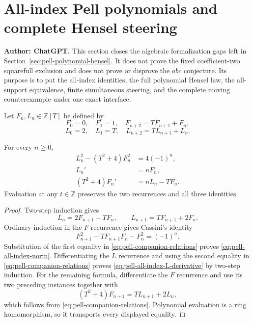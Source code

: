 
\section{All-index Pell polynomials and complete Hensel steering}
\label{sec:pell-all-index-formalization}

\noindent\textbf{Author: ChatGPT.}\quad
This section closes the algebraic formalization gaps left in
Section~\ref{sec:pell-polynomial-hensel}.  It does not prove the fixed
coefficient-two squarefull exclusion and does not prove or disprove the
$abc$ conjecture.  Its purpose is to put the all-index identities, the full
polynomial Hensel law, the all-support equivalence, finite simultaneous
steering, and the complete moving counterexample under one exact interface.

Let $F_n,L_n\in\mathbb Z[T]$ be defined by
\[
 F_0=0,\quad F_1=1,\quad F_{n+2}=TF_{n+1}+F_n,
\]
\[
 L_0=2,\quad L_1=T,\quad L_{n+2}=TL_{n+1}+L_n.
\]

\begin{theorem}
\label{thm:pell-all-index-polynomial}
For every $n\geq0$,
\begin{align}
 L_n^2-(T^2+4)F_n^2&=4(-1)^n,\label{eq:pell-all-index-norm}\\
 L_n'&=nF_n,\label{eq:pell-all-index-L-derivative}\\
 (T^2+4)F_n'&=nL_n-TF_n.\label{eq:pell-all-index-F-derivative}
\end{align}
Evaluation at any $t\in\mathbb Z$ preserves the two recurrences and all
three identities.
\end{theorem}

\begin{proof}
Two-step induction gives
\begin{equation}\label{eq:pell-companion-relations}
 L_n=2F_{n+1}-TF_n,
 \qquad L_{n+1}=TF_{n+1}+2F_n.
\end{equation}
Ordinary induction in the $F$ recurrence gives Cassini's identity
\[
 F_{n+1}^2-TF_{n+1}F_n-F_n^2=(-1)^n.
\]
Substitution of the first equality in
\eqref{eq:pell-companion-relations} proves
\eqref{eq:pell-all-index-norm}.  Differentiating the $L$ recurrence and
using the second equality in \eqref{eq:pell-companion-relations} proves
\eqref{eq:pell-all-index-L-derivative} by two-step induction.  For the
remaining formula, differentiate the $F$ recurrence and use its two
preceding instances together with
\[
 (T^2+4)F_{n+1}=TL_{n+1}+2L_n,
\]
which follows from \eqref{eq:pell-companion-relations}.  Polynomial
evaluation is a ring homomorphism, so it transports every displayed equality.
\end{proof}

